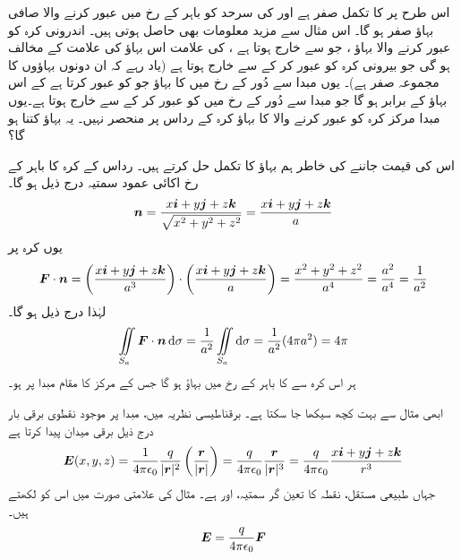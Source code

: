 اس طرح  پر  کا تکمل صفر ہے اور  کی سرحد کو  باہر کے   رخ  میں عبور کرنے والا صافی بہاؤ صفر ہو گا۔ اس مثال  سے مزید معلومات بھی حاصل ہوتی ہیں۔ اندرونی کرہ   کو  عبور کرنے والا  بہاؤ  ، جو  سے خارج  ہوتا ہے  ، کی علامت اس بہاؤ کی علامت  کے  مخالف  ہو گی جو بیرونی کرہ   کو عبور کر کے  سے خارج ہوتا ہے (یاد رہے  کہ ان   دونوں بہاؤوں کا مجموعہ صفر ہے)۔ یوں مبدا سے دُور کے رخ  میں    کا بہاؤ جو  کو عبور کرتا ہے    کے اس بہاؤ کے برابر ہو گا جو   مبدا سے دُور کے رخ میں   کو  عبور کر کے   سے خارج ہوتا ہے۔یوں مبدا  مرکز کرہ   کو عبور کرنے والا  کا  بہاؤ کرہ کے رداس پر منحصر نہیں۔ یہ بہاؤ کتنا ہو گا؟ 

اس کی قیمت جاننے کی خاطر ہم بہاؤ کا تکمل حل کرتے ہیں۔ رداس  کے کرہ  کا باہر  کے رخ اکائی عمود سمتیہ درج ذیل ہو گا۔
\begin{align*}
{\boldsymbol{n}}=\frac{x{\boldsymbol{i}}+y{\boldsymbol{j}}+z{\boldsymbol{k}}}{\sqrt{x^2+y^2+z^2}}=\frac{x{\boldsymbol{i}}+y{\boldsymbol{j}}+z{\boldsymbol{k}}}{a}
\end{align*}
یوں کرہ پر
\begin{align*}
{\ensuremath{{\boldsymbol{F}}}}\cdot{\boldsymbol{n}}=\left(\frac{x{\boldsymbol{i}}+y{\boldsymbol{j}}+z{\boldsymbol{k}}}{a^3}\right)\cdot \left(\frac{x{\boldsymbol{i}}+y{\boldsymbol{j}}+z{\boldsymbol{k}}}{a}\right)=\frac{x^2+y^2+z^2}{a^4}=\frac{a^2}{a^4}=\frac{1}{a^2}
\end{align*}
لہٰذا درج ذیل ہو گا۔
\begin{align*}
\iint\limits_{S_a}\kvec{F}\cdot\an\dif\sigma =\frac{1}{a^2}\iint\limits_{S_a}\dif \sigma=\frac{1}{a^2}(4\pi a^2)=4\pi
\end{align*}
ہر  اس کرہ سے  کا  باہر   کے رخ  میں بہاؤ  ہو گا جس کے مرکز  کا مقام مبدا پر ہو۔

ابھی  مثال  سے بہت کچھ سیکھا جا سکتا ہے۔ برقناطیسی نظریہ میں، مبدا پر موجود  نقطوی برقی بار   درج ذیل برقی میدان پیدا کرتا ہے
\begin{align*}
{\ensuremath{{\boldsymbol{E}}}}(x,y,z)=\frac{1}{4\pi \epsilon_0}\frac{q}{|{{\boldsymbol{r}}}|^2}\left(\frac{{{\boldsymbol{r}}}}{|{{\boldsymbol{r}}}|}\right)=\frac{q}{4\pi \epsilon_0}\frac{{{\boldsymbol{r}}}}{|{{\boldsymbol{r}}}|^3}=\frac{q}{4\pi\epsilon_0}\frac{x{\boldsymbol{i}}+y{\boldsymbol{j}}+z{\boldsymbol{k}}}{r^3}
\end{align*}
جہاں  طبیعی مستقل،   نقطہ  کا  تعین گر سمتیہ، 
اور  ہے۔   مثال   کی علامتی  صورت میں  اس کو لکھتے ہیں۔
\begin{align*}
{\ensuremath{{\boldsymbol{E}}}}=\frac{q}{4\pi\epsilon_0}{{\boldsymbol{F}}}
\end{align*}

